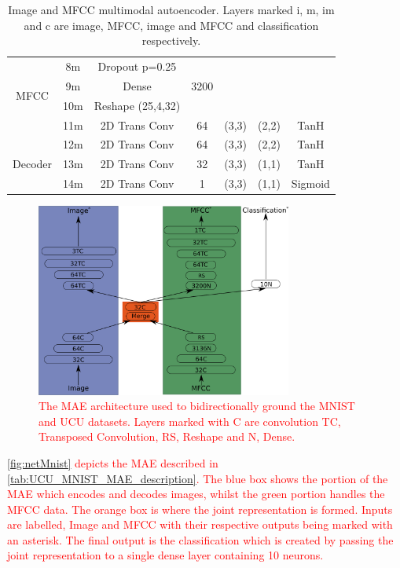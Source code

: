 \begin{table}[h!]
\begin{tabular}{|c|c|c|c|c|c|c|}
			\multirow{4}{*}{MFCC} & 8m 	&	Dropout p=0.25 &	 & 	     &        & \\ \cline{2-7}
			& 9m	&	Dense			& 3200 & &           & \\ \cline{2-7}
			& 10m	&	Reshape (25,4,32) & & & &\\ \cline{2-7}
			& 11m	&	2D Trans Conv & 64 & (3,3) & (2,2)  & TanH \\ \cline{2-7}
			\multirow{3}{*}{Decoder}& 12m	&	2D Trans Conv & 64 & (3,3) & (2,2)  & TanH \\ \cline{2-7}
			& 13m	&	2D Trans Conv & 32 & (3,3) & (1,1)  & TanH \\ \cline{2-7}
			& 14m	&	2D Trans Conv & 1 & (3,3) & (1,1)  & Sigmoid\\ \hline
		\end{tabular}
		\caption{Image and MFCC multimodal autoencoder. Layers marked i, m, im and c are image, MFCC, image and MFCC and classification respectively.}
		\label{tab:UCU_MNIST_MAE_description}

	\end{table}


\begin{figure}
\centering
\includegraphics[width=0.75\textwidth]{Figs/mnistSpoken/grounderW2V.png}
\caption{\textcolor{red}{The \ac{MAE} architecture used to bidirectionally ground the MNIST and UCU datasets. Layers marked with C are convolution TC, Transposed Convolution, RS, Reshape and N, Dense.}}
\label{fig:netMnist}
\end{figure}

\textcolor{red}{\autoref{fig:netMnist} depicts the \ac{MAE} described in \autoref{tab:UCU_MNIST_MAE_description}. The blue box shows the portion of the \ac{MAE} which encodes and decodes images, whilst the green portion handles the MFCC data. The orange box is where the joint representation is formed. Inputs are labelled, Image and MFCC with their respective outputs being marked with an asterisk. The final output is the classification which is created by passing the joint representation to a single dense layer containing 10 neurons.}

